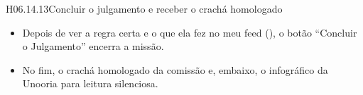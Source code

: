 \begin{historia}{H06.14.13}{Concluir o julgamento e receber o crachá homologado}{\parcial}
\aceite
\begin{itemize}
  \item Depois de ver a regra certa e o que ela fez no meu feed
    (), o botão \enquote{Concluir o Julgamento} encerra a
    missão.
  \item No fim, o crachá homologado da comissão e, embaixo, o infográfico da
    Unooria para leitura silenciosa.
\end{itemize}
\end{historia}

